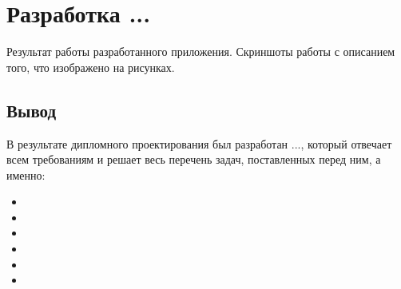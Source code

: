 \section{Разработка ...}
\label{sec:development}

Результат работы разработанного приложения. Скриншоты работы с описанием того, что изображено на рисунках.


\subsection{Вывод}
В результате дипломного проектирования был разработан ..., который отвечает всем требованиям и решает весь перечень задач, поставленных перед ним, а именно:

\begin{itemize}
    \item 
    \item  
    \item  
    \item  
    \item  
    \item  
\end{itemize}